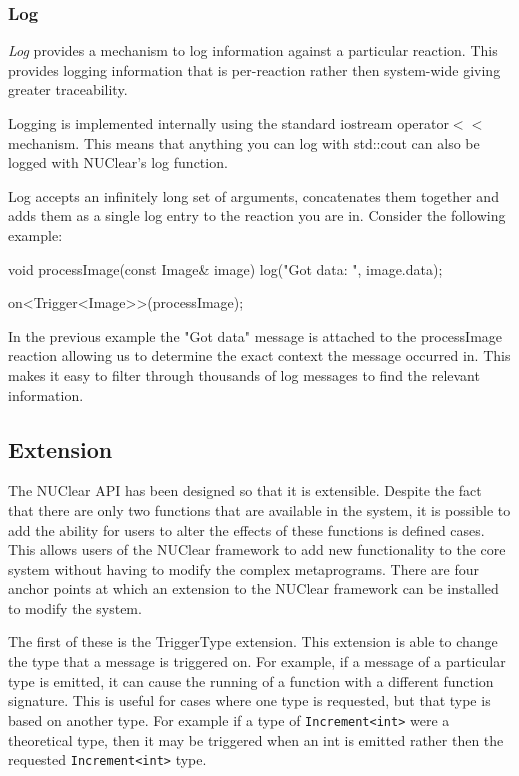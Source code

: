 \documentclass[english,12pt]{scrartcl}
\begin{document}
			\subsubsection{Log}
				\emph{Log} provides a mechanism to log information against a particular reaction. 
				This provides logging information that is per-reaction rather then system-wide giving greater traceability.
				
				Logging is implemented internally using the standard iostream operator$<<$ mechanism.
				This means that anything you can log with std::cout can also be logged with NUClear's log function.
				
				Log accepts an infinitely long set of arguments, concatenates them together and adds them as a single log entry to the reaction you are in. 
				Consider the following example: 
				
				\begin{cppcode}
					void processImage(const Image& image) {
					    log("Got data: ", image.data);
					}
					
					on<Trigger<Image>>(processImage);
				\end{cppcode}
				
				In the previous example the "Got data" message is attached to the processImage reaction allowing us to determine the exact context the message occurred in.
				This makes it easy to filter through thousands of log messages to find the relevant information.
				
		\subsection{Extension}
			The NUClear API has been designed so that it is extensible.
			Despite the fact that there are only two functions that are available in the system, it is possible to add the ability for users to alter the effects of these functions is defined cases.
			This allows users of the NUClear framework to add new functionality to the core system without having to modify the complex metaprograms.
			There are four anchor points at which an extension to the NUClear framework can be installed to modify the system.
			
			The first of these is the TriggerType extension.
			This extension is able to change the type that a message is triggered on.
			For example, if a message of a particular type is emitted, it can cause the running of a function with a different function signature.
			This is useful for cases where one type is requested, but that type is based on another type.
			For example if a type of \texttt{Increment<int>} were a theoretical type, then it may be triggered when an int is emitted rather then the requested \texttt{Increment<int>} type.
			
\end{document}

